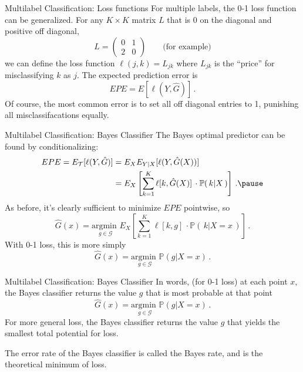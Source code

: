 \documentclass[10pt, table, dvipsnames,xcdraw, handout]{beamer}
\newcommand{\cT}{\ensuremath{\mathcal{T}}}
\newcommand{\cG}{\ensuremath{\mathcal{G}}}
\newcommand{\bP}{\ensuremath{\mathbb{P}}}
\begin{document}
\begin{frame}[fragile]{Multilabel Classification: Loss functions}
For multiple labels, the 0-1 loss function can be generalized. For any $K\times K$ matrix $L$ that is 0 on the diagonal and positive off diagonal, 
$$
L = \left(
\begin{matrix}
0&1\\
2&0
\end{matrix}
\right)\hspace{2em}\text{(for example)}
$$
we can define the loss function $\ell(j,k) = L_{jk}$ where $L_{jk}$ is the ``price'' for misclassifying $k$ as $j$. \pause The expected prediction error is 
$$
EPE = E[\ell(Y, \hat G)]\,.
$$\pause 
Of course, the most common error is to set all off diagonal entries to 1, punishing all misclassifacations equally. 
\end{frame}



\begin{frame}[fragile]{Multilabel Classification: Bayes Classifier}
The Bayes optimal predictor can be found by conditionalizing:
\begin{align*}
EPE = E_\cT[\ell(Y, \hat G)] &= E_X E_{Y|X}[\ell(Y, \hat G(X))] 
\\
&=E_X\left[
\sum_{k=1}^K \ell[k,\hat G(X)]\,\cdot \bP(\,k|X\,)
\right]\,.\pause
\end{align*}
As before, it's clearly sufficient to minimize $EPE$ pointwise, so 
$$
\hat G(x) = \underset{g\in \cG}{\text{argmin }} E_X\left[
\sum_{k=1}^K \ell[k,g]\,\cdot \bP(\,k|X=x\,)\right]\,.
$$\pause
With 0-1 loss, this is more simply
$$
\hat G(x)  = \underset{g\in \cG}{\text{argmin }} \bP(g|X=x)\,.
$$
\end{frame}



\begin{frame}[fragile]{Multilabel Classification: Bayes Classifier}
In words, (for 0-1 loss) at each point $x$, the Bayes classifier returns the value $g$ that is most probable at that point
$$
\hat G(x)  = \underset{g\in \cG}{\text{argmin }} \bP(g|X=x)\,.
$$\pause
For more general loss, the Bayes classifier returns the value $g$ that yields the smallest total potential for loss.  \pause

The error rate of the Bayes classifier is called the Bayes rate, and is the theoretical minimum of loss. 
\end{frame}
\end{document}
